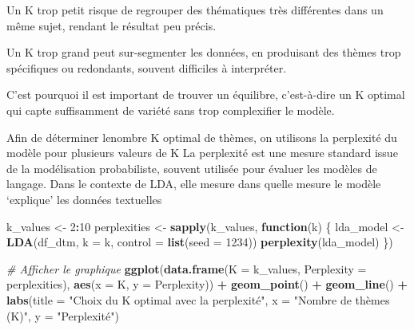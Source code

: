 \documentclass[
]{article}
\newenvironment{Shaded}{\begin{snugshade}}{\end{snugshade}}
\newcommand{\AttributeTok}[1]{\textcolor[rgb]{0.13,0.29,0.53}{#1}}
\newcommand{\CommentTok}[1]{\textcolor[rgb]{0.56,0.35,0.01}{\textit{#1}}}
\newcommand{\ControlFlowTok}[1]{\textcolor[rgb]{0.13,0.29,0.53}{\textbf{#1}}}
\newcommand{\DecValTok}[1]{\textcolor[rgb]{0.00,0.00,0.81}{#1}}
\newcommand{\FunctionTok}[1]{\textcolor[rgb]{0.13,0.29,0.53}{\textbf{#1}}}
\newcommand{\NormalTok}[1]{#1}
\newcommand{\OtherTok}[1]{\textcolor[rgb]{0.56,0.35,0.01}{#1}}
\newcommand{\SpecialCharTok}[1]{\textcolor[rgb]{0.81,0.36,0.00}{\textbf{#1}}}
\newcommand{\StringTok}[1]{\textcolor[rgb]{0.31,0.60,0.02}{#1}}
\begin{document}
Un K trop petit risque de regrouper des thématiques très différentes
dans un même sujet, rendant le résultat peu précis.

Un K trop grand peut sur-segmenter les données, en produisant des thèmes
trop spécifiques ou redondants, souvent difficiles à interpréter.

C'est pourquoi il est important de trouver un équilibre, c'est-à-dire un
K optimal qui capte suffisamment de variété sans trop complexifier le
modèle.

Afin de déterminer lenombre K optimal de thèmes, on utilisons la
perplexité du modèle pour plusieurs valeurs de K La perplexité est une
mesure standard issue de la modélisation probabiliste, souvent utilisée
pour évaluer les modèles de langage. Dans le contexte de LDA, elle
mesure dans quelle mesure le modèle `explique' les données textuelles

\begin{Shaded}
\begin{Highlighting}[]
\NormalTok{k\_values }\OtherTok{\textless{}{-}} \DecValTok{2}\SpecialCharTok{:}\DecValTok{10}
\NormalTok{perplexities }\OtherTok{\textless{}{-}} \FunctionTok{sapply}\NormalTok{(k\_values, }\ControlFlowTok{function}\NormalTok{(k) \{}
\NormalTok{  lda\_model }\OtherTok{\textless{}{-}} \FunctionTok{LDA}\NormalTok{(df\_dtm, }\AttributeTok{k =}\NormalTok{ k, }\AttributeTok{control =} \FunctionTok{list}\NormalTok{(}\AttributeTok{seed =} \DecValTok{1234}\NormalTok{))}
  \FunctionTok{perplexity}\NormalTok{(lda\_model)}
\NormalTok{\})}

\CommentTok{\# Afficher le graphique}
\FunctionTok{ggplot}\NormalTok{(}\FunctionTok{data.frame}\NormalTok{(}\AttributeTok{K =}\NormalTok{ k\_values, }\AttributeTok{Perplexity =}\NormalTok{ perplexities), }\FunctionTok{aes}\NormalTok{(}\AttributeTok{x =}\NormalTok{ K, }\AttributeTok{y =}\NormalTok{ Perplexity)) }\SpecialCharTok{+}
  \FunctionTok{geom\_point}\NormalTok{() }\SpecialCharTok{+} \FunctionTok{geom\_line}\NormalTok{() }\SpecialCharTok{+}
  \FunctionTok{labs}\NormalTok{(}\AttributeTok{title =} \StringTok{"Choix du K optimal avec la perplexité"}\NormalTok{,}
       \AttributeTok{x =} \StringTok{"Nombre de thèmes (K)"}\NormalTok{, }\AttributeTok{y =} \StringTok{"Perplexité"}\NormalTok{)}
\end{Highlighting}
\end{Shaded}
\end{document}
